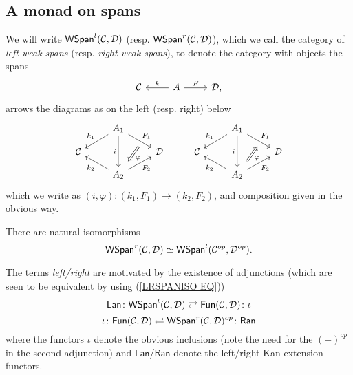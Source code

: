 \documentclass[a4paper,10pt]{article}%
\begin{document}
\subsection{A monad on spans}

\begin{definition}
We will write 
$\mathsf{WSpan}^l(\mathcal{C},\mathcal{D})$
(resp.
$\mathsf{WSpan}^r(\mathcal{C},\mathcal{D})$),
which we call the category of  \textit{left weak spans} (resp. \textit{right weak spans}),
to denote the category with objects the spans
\[
\begin{tikzcd}
\C & A \ar{l}[swap]{k} \ar{r}{F} & \D,
\end{tikzcd}
\]
arrows the diagrams as on the left (resp. right) below \begin{equation}\label{TWISTEDARROWRIGHT EQ}
	\begin{tikzcd}[row sep=small]
	&
	A_1 \ar{dl}[swap,name=k1]{k_1} \ar{dr}[name=F11]{F_1} \ar{dd}[swap]{i} & &
	&
	A_1 \ar{dl}[swap,name=k1]{k_1} \ar{dr}[name=F1]{F_1} \ar{dd}[swap]{i} 
\\
	\C & & \D &
	\C & & \D 
\\
		& |[alias=G21]| A_2  \ar{ul}{k_2} \ar{ur}[swap]{F_2} & &
		& |[alias=G2]| A_2  \ar{ul}{k_2} \ar{ur}[swap]{F_2} &
		\arrow[Leftarrow, from=F1, to=G2,shorten >=0.25cm,shorten <=0.25cm,"\varphi"]
		\arrow[Rightarrow, from=F11, to=G21,shorten >=0.25cm,shorten <=0.25cm,"\varphi"]
	\end{tikzcd}
\end{equation}
which we write as $(i,\varphi) \colon (k_1,F_1) \to (k_2,F_2)$, and composition given in the obvious way.
\end{definition}


\begin{remark}
There are natural isomorphisms
\begin{equation}\label{LRSPANISO EQ}
\mathsf{WSpan}^r(\mathcal{C},\mathcal{D}) \simeq \mathsf{WSpan}^l(\mathcal{C}^{op},\mathcal{D}^{op}).
\end{equation}
\end{remark}


\begin{remark}\label{RANLANADJ REM}
The terms \textit{left/right} are motivated by the existence of adjunctions (which are seen to be equivalent by using (\ref{LRSPANISO EQ}))
\[
	\mathsf{Lan} \colon
	\mathsf{WSpan}^l(\mathcal{C}, \mathcal{D})
		\rightleftarrows
	\mathsf{Fun}(\mathcal{C}, \mathcal{D})
	\colon \iota
\]
\[
	\iota \colon 
	\mathsf{Fun}(\mathcal{C}, \mathcal{D})
		\rightleftarrows
	\mathsf{WSpan}^r(\mathcal{C}, \mathcal{D})^{op}
	\colon \mathsf{Ran}
\]
where the functors $\iota$ denote the obvious inclusions 
(note the need for the $(\minus)^{op}$ in the second adjunction) 
and $\mathsf{Lan}$/$\mathsf{Ran}$ denote the left/right Kan extension functors.
\end{remark}
\end{document}
